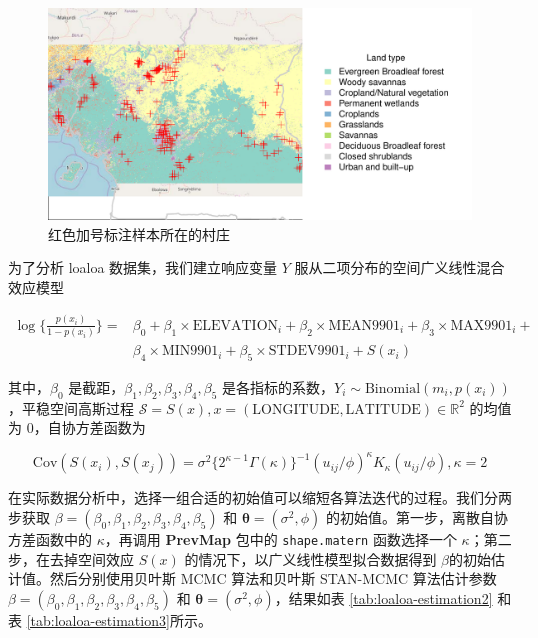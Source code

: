 \documentclass[12pt,a4paper,UTF8,twoside]{book}
\theoremstyle{definition}
\theoremstyle{definition}
\theoremstyle{definition}
\theoremstyle{remark}
\begin{document}
\begin{figure}

{\centering \includegraphics[width=0.9\linewidth]{figures/map-loaloa} 

}

\caption{红色加号标注样本所在的村庄}\label{fig:loaloa-map}
\end{figure}

\noindent 为了分析 loaloa 数据集，我们建立响应变量 \(Y\)
服从二项分布的空间广义线性混合效应模型

\begin{equation*}
\begin{split}
\log\big\{ \frac{ p(x_i)}{ 1-p(x_i)} \big\} = 
               & \beta_{0} + \beta_{1} \times \mathrm{ELEVATION}_{i} + \beta_{2} \times \mathrm{MEAN9901}_{i} + \beta_{3} \times \mathrm{MAX9901}_{i} + \\
               & \beta_{4} \times \mathrm{MIN9901}_{i} +  \beta_{5} \times \mathrm{STDEV9901}_{i} + S(x_{i})
\end{split}
\end{equation*}

\noindent 其中，\(\beta_0\)
是截距，\(\beta_{1},\beta_{2}, \beta_{3},\beta_{4}, \beta_{5}\)
是各指标的系数，\(Y_{i} \sim \mathrm{Binomial}(m_{i},p(x_i))\)，平稳空间高斯过程
\(\mathcal{S} = S(x), x = ( \mathrm{LONGITUDE}, \mathrm{LATITUDE}) \in \mathbb{R}^2\)
的均值为 0，自协方差函数为

\[
\mathrm{Cov}(S(x_i),S(x_j)) = \sigma^2 \big\{2^{\kappa-1}\Gamma(\kappa)\big\}^{-1}(u_{ij}/\phi)^{\kappa}K_{\kappa}(u_{ij}/\phi), \kappa = 2
\]

在实际数据分析中，选择一组合适的初始值可以缩短各算法迭代的过程。我们分两步获取
\(\beta = (\beta_{0},\beta_{1},\beta_{2}, \beta_{3},\beta_{4}, \beta_{5})\)
和 \(\boldsymbol{\theta} = (\sigma^2,\phi)\)
的初始值。第一步，离散自协方差函数中的 \(\kappa\)，再调用
\textbf{PrevMap} 包中的 \texttt{shape.matern} 函数选择一个
\(\kappa\)；第二步，在去掉空间效应 \(S(x)\)
的情况下，以广义线性模型拟合数据得到
\(\beta\)的初始估计值。然后分别使用贝叶斯 MCMC 算法和贝叶斯 STAN-MCMC
算法估计参数
\(\beta = (\beta_{0},\beta_{1},\beta_{2}, \beta_{3},\beta_{4}, \beta_{5})\)
和 \(\boldsymbol{\theta} = (\sigma^2,\phi)\)，结果如表
\ref{tab:loaloa-estimation2} 和表 \ref{tab:loaloa-estimation3}所示。
\end{document}
